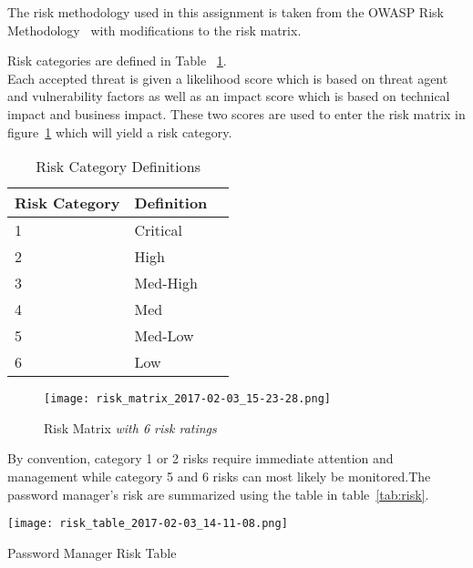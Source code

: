 
The risk methodology used in this assignment is taken from the OWASP Risk
Methodology~\cite{owasprisk} with modifications to the risk matrix.





Risk categories are defined in Table ~\ref{tab:risk_cat}.\\


Each accepted threat is given a likelihood score which is based on threat agent and vulnerability factors as well as an impact score which is based on technical impact and business impact.  These two scores are used to enter the risk matrix in figure~\ref{fig:riskmatrix} which will yield a risk category.

\begin{table}[h]
    \centering
    \begin{tabular}{l l l }
    \hline
    Risk Category & Definition \\
    \hline
    1 & Critical\\
    2 & High\\
    3 & Med-High\\
    4 & Med\\
    5 & Med-Low\\
    6 & Low \\
    \end{tabular}
    \caption{Risk Category Definitions}
    \label{tab:risk_cat}
\end{table}

\begin{figure}[h]
    \centering
    \texttt{[image: risk\_matrix\_2017-02-03\_15-23-28.png]}
    \caption{Risk Matrix\emph{ with 6 risk ratings}}
    \label{fig:riskmatrix}
\end{figure}

By convention, category 1 or 2 risks require immediate attention and management
while category 5 and 6 risks can most likely be monitored.The password manager's risk are summarized using the table in table~\ref{tab:risk}.


\begin{sidewaystable}[]
    \texttt{[image: risk\_table\_2017-02-03\_14-11-08.png]}
    \caption{Password Manager Risk Table}
    \label{tab:risk}
\end{sidewaystable}


